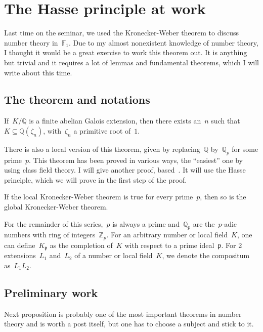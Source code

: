 \section{The Hasse principle at work}
Last time on the seminar, we used the Kronecker-Weber theorem to discuss number theory in~$\mathbb{F}_1$. Due to my almost nonexistent knowledge of number theory, I thought it would be a great exercise to work this theorem out. It is anything but trivial and it requires a lot of lemmas and fundamental theorems, which I will write about this time.

\subsection{The theorem and notations}
\begin{theorem}
  If~$K/\mathbb{Q}$ is a finite abelian Galois extension, then there exists an~$n$ such that~$K \subseteq \mathbb{Q}(\zeta_n)$, with~$\zeta_n$ a primitive root of~$1$.
\end{theorem}

There is also a local version of this theorem, given by replacing~$\mathbb{Q}$ by~$\mathbb{Q}_p$ for some prime~$p$. This theorem has been proved in various ways, the ``easiest'' one by using class field theory. I will give another proof, based~\cite{introduction-to-cyclotomic-fields}. It will use the Hasse principle, which we will prove in the first step of the proof.

\begin{theorem}
  If the local Kronecker-Weber theorem is true for every prime~$p$, then so is the global Kronecker-Weber theorem.
\end{theorem}

For the remainder of this series,~$p$ is always a prime and~$\mathbb{Q}_p$ are the~$p$-adic numbers with ring of integers~$\mathbb{Z}_p$. For an arbitrary number or local field~$K$, one can define~$K_\mathfrak{p}$ as the completion of~$K$ with respect to a prime ideal~$\mathfrak{p}$. For 2 extensions~$L_1$ and~$L_2$ of a number or local field~$K$, we denote the compositum as~$L_1L_2$.

\subsection{Preliminary work}
Next proposition is probably one of the most important theorems in number theory and is worth a post itself, but one has to choose a subject and stick to it.

